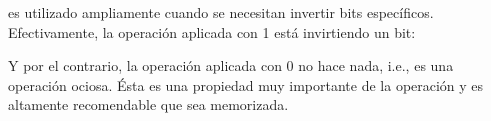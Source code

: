 ﻿\XOR es utilizado ampliamente cuando se necesitan invertir bits espec\'ificos.
Efectivamente, la operaci\'on \XOR aplicada con 1 est\'a invirtiendo un bit:



Y por el contrario, la operaci\'on \XOR aplicada con 0 no hace nada, i.e., es una operaci\'on ociosa.
\'Esta es una propiedad muy importante de la operaci\'on \XOR y es altamente recomendable que sea memorizada.

